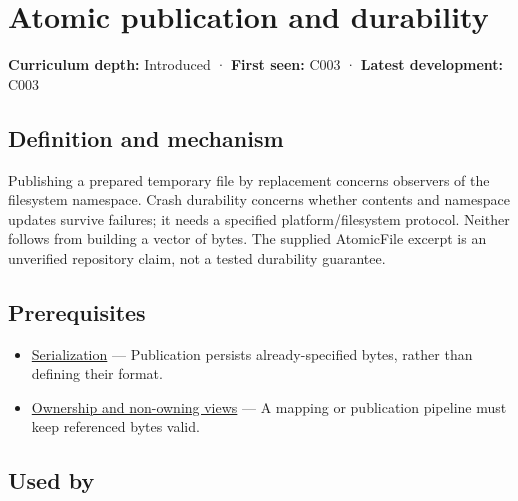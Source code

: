 \hypertarget{appendix-e89a8f290ef5}{}\label{referencestart:appendix-e89a8f290ef5}
\section{Atomic publication and durability}\label{appendix-e89a8f290ef5-atomic-publication-and-durability}

\hypertarget{appendix-e89a8f290ef5-atomic-publication-and-durability}{}

\textbf{Curriculum depth:} Introduced · \textbf{First seen:} C003 · \textbf{Latest development:} C003

\begin{allmightroledefinition}

\subsection{Definition and mechanism}\label{appendix-e89a8f290ef5-definition-and-mechanism}

\hypertarget{appendix-e89a8f290ef5-definition-and-mechanism}{}

Publishing a prepared temporary file by replacement concerns observers of the filesystem namespace. Crash durability concerns whether contents and namespace updates survive failures; it needs a specified platform/filesystem protocol. Neither follows from building a vector of bytes. The supplied AtomicFile excerpt is an unverified repository claim, not a tested durability guarantee.

\end{allmightroledefinition}

\subsection{Prerequisites}\label{appendix-e89a8f290ef5-prerequisites}

\hypertarget{appendix-e89a8f290ef5-prerequisites}{}

\begin{itemize}
\tightlist
\item
  \hyperref[appendix-91d09ebed979]{Serialization} --- Publication persists already-specified bytes, rather than defining their format.
\item
  \hyperref[appendix-d52e4486f527]{Ownership and non-owning views} --- A mapping or publication pipeline must keep referenced bytes valid.
\end{itemize}

\subsection{Used by}\label{appendix-e89a8f290ef5-used-by}

